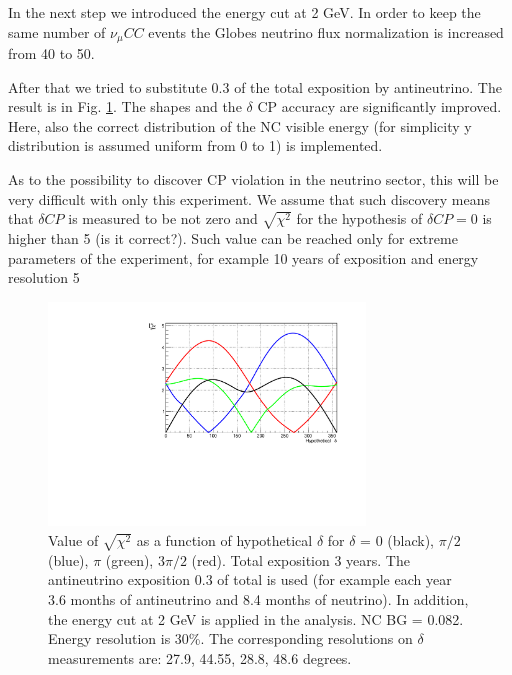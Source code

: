 \documentclass[prd,showpacs,groupedaddress,superscriptaddress,amsmath,amssymb]{revtex4-2} %
\begin{document}
 In the next step we introduced the energy cut at 2 GeV. In order to keep the same number of $\nu_{\mu}CC$ events the Globes neutrino flux normalization
is increased from 40 to 50.

 After that we tried to substitute 0.3 of the total exposition by antineutrino. The result is in Fig. \ref{fig:del_anu}. The shapes and the
$\delta$ CP accuracy are significantly improved. Here, also the correct distribution of the NC visible energy (for simplicity y distribution
is assumed uniform from 0 to 1) is implemented.

 As to the possibility to discover CP violation in the neutrino sector, this will be very difficult with only this experiment. We assume that
such discovery means that $\delta CP$ is measured to be not zero and $\sqrt{\chi^2}$ for the hypothesis of $\delta CP = 0$ is higher than 5
(is it correct?). Such value can be reached only for extreme parameters of the experiment, for example 10 years of exposition and energy
resolution 5%

\begin{figure}[h]
\begin{center}
\includegraphics[width=0.75\textwidth]{del_anu.pdf}
\caption {Value of $\sqrt{\chi^2}$ as a function of hypothetical $\delta$ for $\delta$ = 0 (black), $\pi/2$ (blue), $\pi$ (green), $3\pi/2$ (red).
          Total exposition 3 years.
          The antineutrino exposition 0.3 of total is used (for example each year 3.6 months of antineutrino and 8.4 months of neutrino). In addition,
          the energy cut at 2 GeV is applied in the analysis. NC BG = 0.082. Energy resolution is 30\%.
          The corresponding resolutions on $\delta$ measurements are: 27.9, 44.55, 28.8, 48.6 degrees.
\label{fig:del_anu}}
\end{center}
\end{figure}
\end{document}

